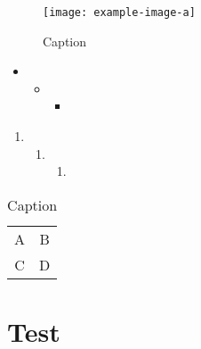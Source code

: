 \documentclass{main}
\institute{Instituto de Química}
\begin{document}
\maketitle
\clearpage
\setcounter{page}{1}

\lipsum[2-4]

\begin{figure}[!ht]
    \centering
    \texttt{[image: example-image-a]}
    \caption{Caption}
    \label{fig:my_label}
\end{figure}

\lipsum[2-4]

\begin{itemize}
    \item \lipsum[1-1]
    \begin{itemize}
        \item \lipsum[1-1]
        \begin{itemize}
            \item \lipsum[1-1]
        \end{itemize}
    \end{itemize}
\end{itemize}

\begin{enumerate}
    \item \lipsum[1-1]
    \begin{enumerate}
        \item \lipsum[1-1]
        \begin{enumerate}
            \item \lipsum[1-1]
        \end{enumerate}
    \end{enumerate}
\end{enumerate}

\begin{table}[t]
    \centering
    \caption{Caption}
    \begin{tabular}{cc}
        A & B  \\
        C & D 
    \end{tabular}
    \label{tab:my_label}
\end{table}

\section*{Test}
\lipsum[1-1]
\end{document}
